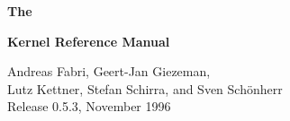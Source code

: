 \vspace*{0.5cm}
\thispagestyle{empty}
\centerline{{\Huge\bf The}}
\vspace{3mm}

\begin{center}
\leavevmode
\epsfysize=2cm
\epsfysize=2cm
\epsfysize=2.1cm
\epsfysize=2cm
\end{center}

\centerline{{\Huge\bf Kernel Reference Manual}
}
\vspace{3mm}

\begin{center}
Andreas Fabri, Geert-Jan Giezeman,\\
Lutz Kettner, Stefan Schirra, and Sven Sch\"onherr\\[2cm]
{\small Release 0.5.3, November 1996}
\end{center}
\vspace*{0.5cm}

\begin{center}
\leavevmode
\epsfxsize=12cm
\end{center}


